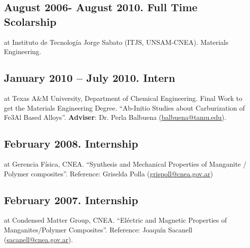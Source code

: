\subsection{August 2006- August 2010. Full Time Scolarship } at Instituto de Tecnología Jorge Sabato (ITJS, UNSAM-CNEA). Materials Engineering. 

\subsection{January 2010 – July 2010. Intern } at Texas A\&M University, Department of Chemical Engineering. Final Work to get the Materials Engineering Degree. “Ab-Initio Studies about Carburization of Fe3Al Based Alloys”. \textbf{Adviser}: Dr. Perla Balbuena (\url{balbuena@tamu.edu}). 

\subsection{February 2008. Internship }at Gerencia Física, CNEA. “Synthesis and Mechanical Properties of Manganite / Polymer composites”. Reference: Griselda Polla (\url{grispoll@cnea.gov.ar})

\subsection{February 2007. Internship} at Condensed Matter Group, CNEA. “Eléctric and Magnetic Properties of Manganites/Polymer Composites”. Reference: Joaquín Sacanell (\url{sacanell@cnea.gov.ar}). 


